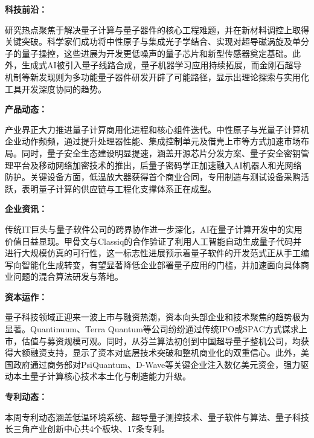 \documentclass[12pt,a4paper]{ctexart}
\begin{document}
\textbf{ 科技前沿：}

研究热点聚焦于解决量子计算与量子器件的核心工程难题，并在新材料调控上取得关键突破。科学家们成功将中性原子与集成光子学结合、实现对超导磁涡旋及单分子的量子操控，这些进展为开发更低噪声的量子芯片和新型传感器奠定基础。此外，生成式AI被引入量子线路合成，量子机器学习应用持续拓展，而金刚石超导机制等新发现则为多功能量子器件研发开辟了可能路径，显示出理论探索与实用化工具开发深度协同的趋势。


\textbf{ 产品动态：}

产业界正大力推进量子计算商用化进程和核心组件迭代。中性原子与光量子计算机企业动作频频，通过提升处理器性能、集成控制单元及借壳上市等方式加速市场布局。同时，量子安全生态建设明显提速，涵盖开源芯片分发方案、量子安全密钥管理平台及移动网络加密技术的推出，后量子密码学正加速融入AI机器人和光网络防护。关键设备方面，低温放大器获得首个商业合同，专用制造与测试设备采购活跃，表明量子计算的供应链与工程化支撑体系正在成型。


\textbf{ 企业资讯：}

传统IT巨头与量子软件公司的跨界协作进一步深化，AI在量子计算开发中的实用价值日益显现。甲骨文与Classiq的合作验证了利用人工智能自动生成量子代码并进行大规模仿真的可行性，这一标志性进展预示着量子软件的开发范式正从手工编写向智能化生成转变，有望显著降低企业部署量子应用的门槛，并加速面向具体商业问题的混合算法研发与落地。


\textbf{ 资本运作：}

量子科技领域正迎来一波上市与融资热潮，资本向头部企业和技术聚焦的趋势极为显著。Quantinuum、Terra Quantum等公司纷纷通过传统IPO或SPAC方式谋求上市，估值与募资规模可观。同时，从芬兰算法初创到中国超导量子整机公司，均获得大额融资支持，显示了资本对底层技术突破和整机商业化的双重信心。此外，美国政府通过商务部对PsiQuantum、D-Wave等关键企业注入数亿美元资金，强力驱动本土量子计算核心技术本土化与制造能力升级。




\textbf{ 专利动态：}

本周专利动态涵盖低温环境系统、超导量子测控技术、量子软件与算法、量子科技长三角产业创新中心共4个板块、17条专利。
\end{document}
